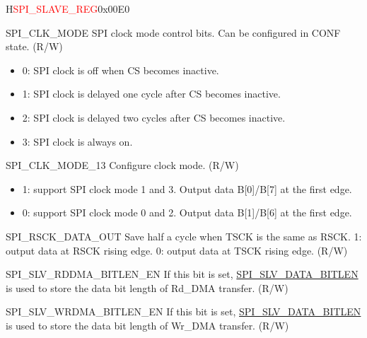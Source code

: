 \begin{register}{H}{\textcolor{red}{SPI\_SLAVE\_REG}}{0x{}00E0}\label{regdesc:SPISLAVEREG}
%
%
%
%
%
%
%
%
%
%
%
%
%
%
\regnewline%
\begin{regdesc}\begin{reglist}
\label{fielddesc:SPICLKMODE}\item [SPI\_CLK\_MODE] SPI clock mode control bits. Can be configured in CONF state. (R/W)
\begin{itemize}
    \item 0: SPI clock is off when CS becomes inactive.
    \item 1: SPI clock is delayed one cycle after CS becomes inactive.
    \item 2: SPI clock is delayed two cycles after CS becomes inactive.
    \item 3: SPI clock is always on.
\end{itemize}
\label{fielddesc:SPICLKMODE13}\item [SPI\_CLK\_MODE\_13] Configure clock mode. (R/W)
\begin{itemize}
    \item 1: support SPI clock mode 1 and 3. Output data B[0]/B[7] at the first edge.
    \item 0: support SPI clock mode 0 and 2. Output data B[1]/B[6] at the first edge.
\end{itemize}
\label{fielddesc:SPIRSCKDATAOUT}\item [SPI\_RSCK\_DATA\_OUT] Save half a cycle when TSCK is the same as RSCK. 1: output data at RSCK rising edge. 0: output data at TSCK rising edge. (R/W)
\label{fielddesc:SPISLVRDDMABITLENEN}\item [SPI\_SLV\_RDDMA\_BITLEN\_EN] If this bit is set, \hyperref[fielddesc:SPISLVDATABITLEN]{SPI\_SLV\_DATA\_BITLEN} is used to store the data bit length of Rd\_DMA transfer. (R/W)
\label{fielddesc:SPISLVWRDMABITLENEN}\item [SPI\_SLV\_WRDMA\_BITLEN\_EN] If this bit is set, \hyperref[fielddesc:SPISLVDATABITLEN]{SPI\_SLV\_DATA\_BITLEN} is used to store the data bit length of Wr\_DMA transfer. (R/W)

\end{reglist}
\end{regdesc}
\end{register}
